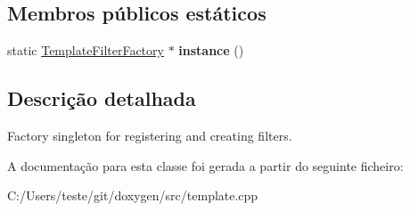 \subsection*{Membros públicos estáticos}
\begin{DoxyCompactItemize}
\item 
\hypertarget{class_template_filter_factory_ab755432c0258e8e9445b7b6ef4775dda}{static \hyperlink{class_template_filter_factory}{Template\-Filter\-Factory} $\ast$ {\bfseries instance} ()}\label{class_template_filter_factory_ab755432c0258e8e9445b7b6ef4775dda}

\end{DoxyCompactItemize}


\subsection{Descrição detalhada}
Factory singleton for registering and creating filters. 

A documentação para esta classe foi gerada a partir do seguinte ficheiro\-:\begin{DoxyCompactItemize}
\item 
C\-:/\-Users/teste/git/doxygen/src/template.\-cpp\end{DoxyCompactItemize}
